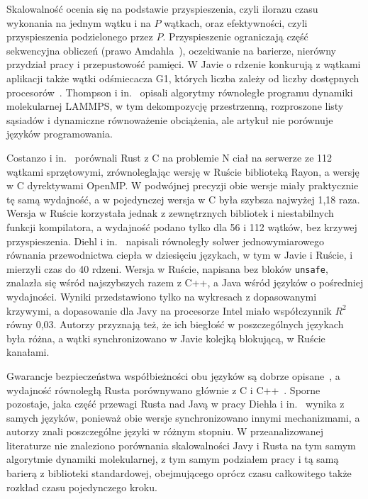 Skalowalność ocenia się na podstawie przyspieszenia, czyli ilorazu czasu wykonania na jednym wątku i na $P$ wątkach, oraz efektywności, czyli przyspieszenia podzielonego przez $P$.
Przyspieszenie ograniczają część sekwencyjna obliczeń (prawo Amdahla~\cite{amdahl1967}), oczekiwanie na barierze, nierówny przydział pracy i przepustowość pamięci.
W Javie o rdzenie konkurują z wątkami aplikacji także wątki odśmiecacza G1, których liczba zależy od liczby dostępnych procesorów~\cite{oracle-g1-25}.
Thompson i in.~\cite{thompson2022} opisali algorytmy równoległe programu dynamiki molekularnej LAMMPS, w tym dekompozycję przestrzenną, rozproszone listy sąsiadów i dynamiczne równoważenie obciążenia, ale artykuł nie porównuje języków programowania.

Costanzo i in.~\cite{costanzo2021} porównali Rust z C na problemie N ciał na serwerze ze 112 wątkami sprzętowymi, zrównoleglając wersję w Ruście biblioteką Rayon, a wersję w C dyrektywami OpenMP.
W podwójnej precyzji obie wersje miały praktycznie tę samą wydajność, a w pojedynczej wersja w C była szybsza najwyżej 1,18 raza.
Wersja w Ruście korzystała jednak z zewnętrznych bibliotek i niestabilnych funkcji kompilatora, a wydajność podano tylko dla 56 i 112 wątków, bez krzywej przyspieszenia.
Diehl i in.~\cite{diehl2024} napisali równoległy solwer jednowymiarowego równania przewodnictwa ciepła w dziesięciu językach, w tym w Javie i Ruście, i mierzyli czas do 40 rdzeni.
Wersja w Ruście, napisana bez bloków \texttt{unsafe}, znalazła się wśród najszybszych razem z C++, a Java wśród języków o pośredniej wydajności.
Wyniki przedstawiono tylko na wykresach z dopasowanymi krzywymi, a dopasowanie dla Javy na procesorze Intel miało współczynnik $R^2$ równy 0,03.
Autorzy przyznają też, że ich biegłość w poszczególnych językach była różna, a wątki synchronizowano w Javie kolejką blokującą, w Ruście kanałami.

Gwarancje bezpieczeństwa współbieżności obu języków są dobrze opisane~\cite{oracle-jls-25,klabnik-rustbook}, a wydajność równoległą Rusta porównywano głównie z C i C++~\cite{costanzo2021,diehl2024}.
Sporne pozostaje, jaka część przewagi Rusta nad Javą w pracy Diehla i in.~\cite{diehl2024} wynika z samych języków, ponieważ obie wersje synchronizowano innymi mechanizmami, a autorzy znali poszczególne języki w różnym stopniu.
W przeanalizowanej literaturze nie znaleziono porównania skalowalności Javy i Rusta na tym samym algorytmie dynamiki molekularnej, z tym samym podziałem pracy i tą samą barierą z biblioteki standardowej, obejmującego oprócz czasu całkowitego także rozkład czasu pojedynczego kroku.


